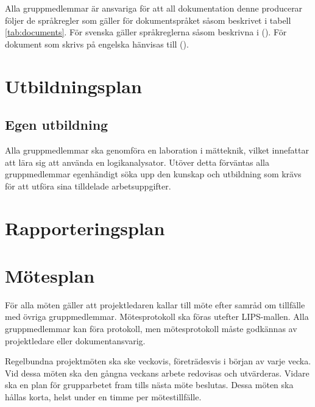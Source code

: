 \documentclass[a4paper,11pt]{article}
\begin{document}
Alla gruppmedlemmar är ansvariga för att all dokumentation denne producerar följer de språkregler som gäller för dokumentspråket såsom beskrivet i tabell \ref{tab:documents}. För svenska gäller språkreglerna såsom beskrivna i  (\cite{Sprakradet2008}). För dokument som skrivs på engelska hänvisas till  (\cite{Ritter2003}).

\label{tab:documents}


\section{Utbildningsplan}
\subsection{Egen utbildning}
Alla gruppmedlemmar ska genomföra en laboration i mätteknik, vilket innefattar att lära sig att använda en logikanalysator. Utöver detta förväntas alla gruppmedlemmar egenhändigt söka upp den kunskap och utbildning som krävs för att utföra sina tilldelade arbetsuppgifter.

\section{Rapporteringsplan}

\section{Mötesplan}
För alla möten gäller att projektledaren kallar till möte efter samråd om tillfälle med övriga gruppmedlemmar. Mötesprotokoll ska föras utefter LIPS-mallen. Alla gruppmedlemmar kan föra protokoll, men mötesprotokoll måste godkännas av projektledare eller dokumentansvarig.

Regelbundna projektmöten ska ske veckovis, företrädesvis i början av varje vecka. Vid dessa möten ska den gångna veckans arbete redovisas och utvärderas. Vidare ska en plan för grupparbetet fram tills nästa möte beslutas. Dessa möten ska hållas korta, helst under en timme per mötestillfälle. 
\end{document}
